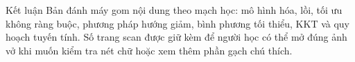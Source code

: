 \documentclass[11pt,a4paper]{article}
\begin{document}
\begin{keybox}{Kết luận}
Bản đánh máy gom nội dung theo mạch học: mô hình hóa, lồi, tối ưu không ràng buộc, phương pháp hướng giảm, bình phương tối thiểu, KKT và quy hoạch tuyến tính. Số trang scan được giữ kèm để người học có thể mở đúng ảnh vở khi muốn kiểm tra nét chữ hoặc xem thêm phần gạch chú thích.
\end{keybox}
\end{document}
